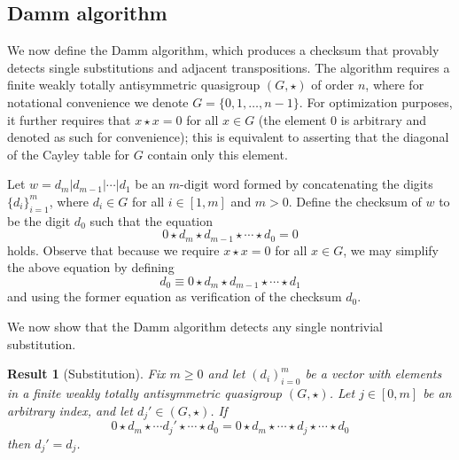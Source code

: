 \documentclass{article}
\theoremstyle{plain}
\newtheorem{result}{Result}[section]
\theoremstyle{definition}
\begin{document}
\subsection{Damm algorithm}

We now define the Damm algorithm, which produces a checksum that provably detects single substitutions and adjacent transpositions.
The algorithm requires a finite weakly totally antisymmetric quasigroup $(G,\star)$ of order $n$, where for notational convenience we denote $G = \{0,1,\ldots,n-1\}$.
For optimization purposes, it further requires that $x \star x = 0$ for all $x \in G$ (the element $0$ is arbitrary and denoted as such for convenience); this is equivalent to asserting that the diagonal of the Cayley table for $G$ contain only this element.

Let $w = d_m | d_{m-1} | \cdots | d_1$ be an $m$-digit word formed by concatenating the digits $\{d_i\}_{i=1}^m$, where $d_i \in G$ for all $i \in [1,m]$ and $m > 0$.
Define the checksum of $w$ to be the digit $d_0$ such that the equation
\[ 0 \star d_m \star d_{m-1} \star \cdots \star d_0 = 0 \]
holds.
Observe that because we require $x \star x = 0$ for all $x \in G$, we may simplify the above equation by defining 
\[ d_0 \equiv 0 \star d_m \star d_{m-1} \star \cdots \star d_1 \]
and using the former equation as verification of the checksum $d_0$.

We now show that the Damm algorithm detects any single nontrivial substitution.
\begin{result}[Substitution]
	\label{result:substitution}
	Fix $m \geq 0$ and let $(d_i)_{i=0}^m$ be a vector with elements in a finite weakly totally antisymmetric quasigroup $(G, \star)$.
	Let $j \in [0, m]$ be an arbitrary index, and let $d_j' \in (G, \star)$.
	If
	\[ 0 \star d_m \star \cdots d_j' \star \cdots \star d_0 = 0 \star d_m \star \cdots \star d_j \star \cdots \star d_0 \]
	then $d_j' = d_j$.
\end{result}
\end{document}
